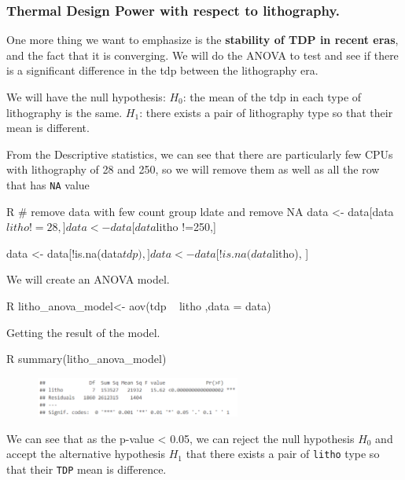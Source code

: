\subsubsection{Thermal Design Power with respect to lithography.}







One more thing we want to emphasize is the \textbf{stability of TDP in recent eras}, and the fact that it is converging. We will do the ANOVA to test and see if there is a significant difference in the tdp between the lithography era.

We will have the null hypothesis:
$H_0$: the mean of the tdp in each type of lithography is the same.
$H_1$: there exists a pair of lithography type so that their mean is different.

From the Descriptive statistics, we can see that there are particularly few CPUs with lithography of 28 and 250, so we will remove them as well as all the row that has \texttt{NA} value
\begin{code}{R}
    # remove data with few count group ldate and remove NA
    data <- data[data$litho !=28,] 
    data <- data[data$litho !=250,] 

    data <- data[!is.na(data$tdp), ]
    data <- data[!is.na(data$litho), ]
\end{code}

We will create an ANOVA model.

\begin{code}{R}
    litho_anova_model<- aov(tdp ~ litho ,data = data)
\end{code}

Getting the result of the model.

\begin{code}{R}
    summary(litho_anova_model)
\end{code}

\begin{figure}[htbp]
    \centering
    \includegraphics[width = 0.6\textwidth]{graphics/litho_anova_model.png}
\end{figure}

We can see that as the p-value < 0.05, we can reject the null hypothesis $H_0$ and accept the 
alternative hypothesis $H_1$ that there exists a pair of \verb|litho| type so that their \verb|TDP| mean is difference.

